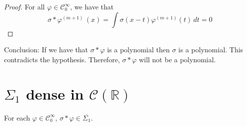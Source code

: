 \documentclass[../main.tex]{subfiles}
\begin{document}
	\begin{proof} For all $\varphi \in \mathcal{C}^\infty_0$, we have that
	$$\sigma \ast \varphi^{(m+1)} \, (x)=\int \sigma(x-t)\varphi^{(m+1)}(t) \, dt= 0$$  
	\end{proof} 
\noindent Conclusion: If we have that $\sigma \ast \varphi$ is a polynomial then $\sigma$ is a polynomial. This contradicts the hypothesis. Therefore, $\sigma \ast \varphi$ will not be a polynomial. 

\section{$\Sigma_1$ dense in $\mathcal{C}(\mathbb{R})$}

	\begin{lema} %
		For each $\varphi \in  \mathcal{C}^\infty_0$, $ \sigma \ast \varphi \in  \overline{\Sigma_1}$. 
		
	\end{lema}
	
\end{document}
